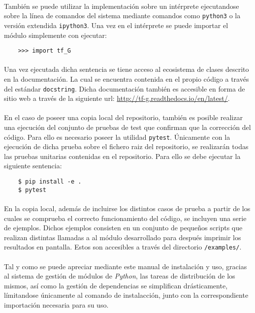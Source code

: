 \documentclass{subfiles}
\begin{document}
    \paragraph{}
    También se puede utilizar la implementación sobre un intérprete ejecutandose sobre la línea de comandos del sistema mediante comandos como \texttt{python3} o la versión extendida \texttt{ipython3}. Una vez en el intérprete se puede importar el módulo simplemente con ejecutar:

    \begin{verbatim}
    >>> import tf_G
    \end{verbatim}

    \paragraph{}
    Una vez ejecutada dicha sentencia se tiene acceso al ecosistema de clases descrito en la documentación. La cual se encuentra contenida en el propio código a través del estándar \texttt{docstring}. Dicha documentación también es accesible en forma de sitio web a través de la siguiente url: \url{http://tf-g.readthedocs.io/en/latest/}.

    \paragraph{}
    En el caso de poseer una copia local del repositorio, también es posible realizar una ejecución del conjunto de pruebas de test que confirman que la corrección del código. Para ello es necesario poseer la utilidad \texttt{pytest}. Únicamente con la ejecución de dicha prueba sobre el fichero raiz del repositorio, se realizarán todas las pruebas unitarias contenidas en el repositorio. Para ello se debe ejecutar la siguiente sentencia:

    \begin{verbatim}
    $ pip install -e .
    $ pytest
    \end{verbatim}

    \paragraph{}
    En la copia local, además de incluirse los distintos casos de prueba a partir de los cuales se comprueba el correcto funcionamiento del código, se incluyen una serie de ejemplos. Dichos ejemplos consisten en un conjunto de pequeños scripts que realizan distintas llamadas a al módulo desarrollado para después imprimir los resultados en pantalla. Estos son accesibles a través del directorio \texttt{/examples/}.

    \paragraph{}
    Tal y como se puede apreciar mediante este manual de instalación y uso, gracias al sistema de gestión de módulos de \emph{Python}, las tareas de distribución de los mismos, así como la gestión de dependencias se simplifican drásticamente, límitandose únicamente al comando de instalacción, junto con la correspondiente importación necesaria para su uso.
\end{document}
